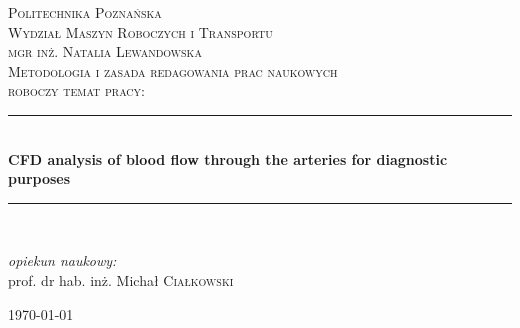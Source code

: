 \documentclass[11pt]{article} %
\begin{document}

\begin{titlepage}

\newcommand{\HRule}{\rule{\linewidth}{0.5mm}} %

\center %

\textsc{\LARGE Politechnika Poznańska}\\[0.5cm] %
\textsc{\large Wydział Maszyn Roboczych i Transportu}\\[2.5cm] %

\textsc{\LARGE mgr inż. Natalia Lewandowska}\\[2.5cm] %

\textsc{\large Metodologia i zasada redagowania prac naukowych}\\[0.1cm] 
\textsc{\small roboczy temat pracy:}\\[0.1cm] 

\HRule \\[0.5cm]
{ \huge \bfseries CFD analysis of blood flow through the arteries for diagnostic purposes}\\[0.4cm] %
\HRule \\[0.5cm]

\begin{flushleft} \large
\emph{opiekun naukowy:}\\
prof. dr hab. inż. Michał \textsc{Ciałkowski}\\[6cm] %
\end{flushleft}

{\large \today}\\[0.5cm] %


\vfill %

\end{titlepage}
\end{document}
